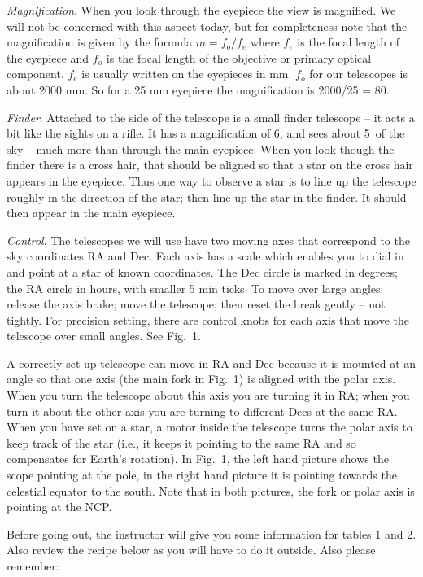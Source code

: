 \documentclass[12pt]{article}
\begin{document}
\medskip \noindent
\emph{Magnification}. When you look through the eyepiece the
view is magnified. We will not be concerned with this aspect today,
but for completeness note that the magnification is given by
the formula $m = f_o/f_e$ where $f_e$ is the focal length of the
eyepiece and $f_o$ is the focal length of the objective or primary
optical component. $f_e$ is usually written on the eyepieces in
mm. $f_o$ for our telescopes is about 2000 mm. So for a 25 mm
eyepiece the magnification is 2000/25 = 80.

\medskip \noindent 
\emph{Finder}. Attached to the side of the telescope is a
small finder telescope -- it acts a
bit like the sights on a rifle. It has a magnification of 6, and
sees about 5\deg\ of the sky -- much more than through the main
eyepiece. When you look though the finder there is a cross hair, that should
be aligned so that a star on the cross hair appears in the
eyepiece. Thus one way to observe a star is to line up the telescope
roughly in the direction of the star; then line up the star in the
finder. It should then appear in the main eyepiece.

\medskip \noindent 
\emph{Control}. The telescopes we will use have two moving axes that
correspond to the sky coordinates RA and Dec. Each axis has a scale
which enables you to dial in and point at a star of known
coordinates. The Dec circle is marked in degrees; the RA circle in
hours, with smaller 5 min ticks. To move over large angles: release
the axis brake; move the telescope; then reset the break gently -- not
tightly. For precision setting, there are control knobs for each axis
that move the telescope over small angles. See Fig.~1.

A correctly set up telescope can move in RA and Dec because it is
mounted at an angle so that one axis (the main fork in Fig.~1) is
aligned with the polar axis. When you turn the telescope about this
axis you are turning it in RA; when you turn it about the other axis
you are turning to different Decs at the same RA. When you have set
on a star, a motor inside the telescope turns the polar axis to keep
track of the star (i.e., it keeps it pointing to the same RA and so
compensates for Earth's rotation). In Fig.~1, the left hand picture
shows the scope pointing at the pole, in the right hand picture it is
pointing towards the celestial equator to the south. Note that in both
pictures, the fork or polar axis is pointing at the NCP.


\medskip\noindent

Before going out, the instructor will give you some information for
tables 1 and 2. Also review the recipe below as you will have to do it
outside. Also please remember:
\end{document}
